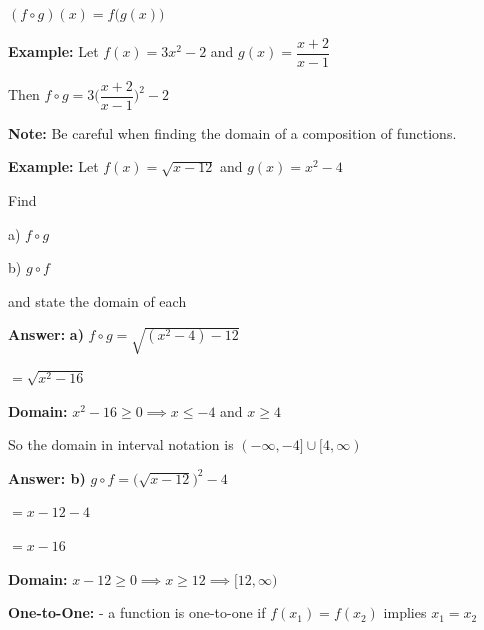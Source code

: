 \documentclass[12pt]{article}
\newenvironment{myindentpar}[1]%
     {\begin{list}{}%
             {\setlength{\leftmargin}{#1}}%
             \item[]%
     }
     {\end{list}}
\begin{document}
$(f \circ g)(x) = f \Big(g(x)\Big)$
\begin{myindentpar}{1cm}


\textbf{Example:} Let $f(x) = 3x^2-2$ and $g(x) = \dfrac{x+2}{x-1}$ 

Then $f \circ g = 3 \Big(\dfrac{x+2}{x-1} \Big)^2 -2$

\textbf{Note:} Be careful when finding the domain of a composition of functions. 
\end{myindentpar}
\begin{myindentpar}{2cm}
\textbf{Example:} Let $f(x) = \sqrt{x-12}$ and $g(x) = x^2-4$

Find 

a) $f \circ g$ 

b) $g \circ f$ 

and state the domain of each
\end{myindentpar}
\begin{myindentpar}{2.5cm}
\textbf{Answer:}
 \textbf{a)} $f \circ g = \sqrt{(x^2-4)-12}$

\hspace{3.3cm} $ = \sqrt{x^2-16}$

\textbf{Domain:} $x^2 - 16 \geq 0 \implies x\leq -4$ and $x \geq 4$

So the domain in interval notation is $(-\infty, -4] \cup [4, \infty)$

\textbf{Answer: b)} $g \circ f = \Big(\sqrt{x-12}\Big)^2 -4$

\hspace{3.3cm} $ = x-12 -4$

\hspace{3.3cm} $ = x-16$

\textbf{Domain:} $x - 12 \geq 0 \implies x \geq  12 \implies [12 , \infty)$
\end{myindentpar}

\textbf{One-to-One:} - a function is one-to-one if $f(x_{1}) = f(x_{2})$ implies $ x_{1}  = x_{2}$
\end{document}
